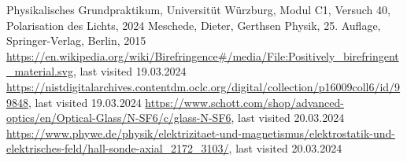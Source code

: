 \documentclass[a4paper,10pt,twocolumn]{article}
\begin{document}
    \begin{thebibliography}{}    %
         Physikalisches Grundpraktikum, Universitüt Würzburg, Modul C1, Versuch 40, Polarisation des Lichts, 2024
         Meschede, Dieter, Gerthsen Physik, 25. Auflage, Springer-Verlag, Berlin, 2015
         \url{https://en.wikipedia.org/wiki/Birefringence#/media/File:Positively_birefringent_material.svg}, last visited 19.03.2024
         \url{https://nistdigitalarchives.contentdm.oclc.org/digital/collection/p16009coll6/id/99848}, last visited 19.03.2024
         \url{https://www.schott.com/shop/advanced-optics/en/Optical-Glass/N-SF6/c/glass-N-SF6}, last visited 20.03.2024 
         \url{https://www.phywe.de/physik/elektrizitaet-und-magnetismus/elektrostatik-und-elektrisches-feld/hall-sonde-axial_2172_3103/}, last visited 20.03.2024
    \end{thebibliography}
    
\end{document}
